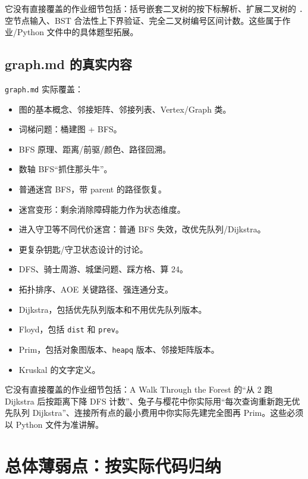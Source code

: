 \documentclass[10pt,a4paper,fontset=none]{ctexart}
\begin{document}
它没有直接覆盖的作业细节包括：括号嵌套二叉树的按下标解析、扩展二叉树的 \texttt{.} 空节点输入、BST 合法性上下界验证、完全二叉树编号区间计数。这些属于作业/Python 文件中的具体题型拓展。

\subsection{graph.md 的真实内容}
\begin{sourcebox}
\texttt{graph.md} 实际覆盖：
\begin{itemize}
  \item 图的基本概念、邻接矩阵、邻接列表、Vertex/Graph 类。
  \item 词梯问题：桶建图 + BFS。
  \item BFS 原理、距离/前驱/颜色、路径回溯。
  \item 数轴 BFS“抓住那头牛”。
  \item 普通迷宫 BFS，带 parent 的路径恢复。
  \item 迷宫变形：剩余消除障碍能力作为状态维度。
  \item 进入守卫等不同代价迷宫：普通 BFS 失效，改优先队列/Dijkstra。
  \item 更复杂钥匙/守卫状态设计的讨论。
  \item DFS、骑士周游、城堡问题、踩方格、算 24。
  \item 拓扑排序、AOE 关键路径、强连通分支。
  \item Dijkstra，包括优先队列版本和不用优先队列版本。
  \item Floyd，包括 \texttt{dist} 和 \texttt{prev}。
  \item Prim，包括对象图版本、\texttt{heapq} 版本、邻接矩阵版本。
  \item Kruskal 的文字定义。
\end{itemize}
\end{sourcebox}

它没有直接覆盖的作业细节包括：A Walk Through the Forest 的“从 2 跑 Dijkstra 后按距离下降 DFS 计数”、兔子与樱花中你实际用“每次查询重新跑无优先队列 Dijkstra”、连接所有点的最小费用中你实际先建完全图再 Prim。这些必须以 Python 文件为准讲解。

\section{总体薄弱点：按实际代码归纳}
\end{document}
